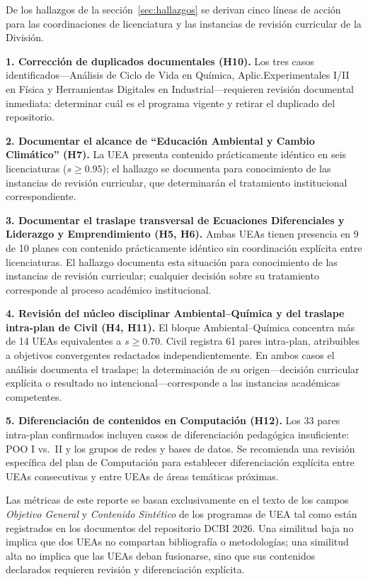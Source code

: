 \documentclass[11pt,a4paper]{article}
\begin{document}
De los hallazgos de la sección~\ref{sec:hallazgos} se derivan cinco líneas de acción para las coordinaciones de licenciatura y las instancias de revisión curricular de la División.

\textbf{1. Corrección de duplicados documentales (H10).}
Los tres casos identificados---Análisis de Ciclo de Vida en Química, Aplic.\@ Experimentales I/II en Física y Herramientas Digitales en Industrial---requieren revisión documental inmediata: determinar cuál es el programa vigente y retirar el duplicado del repositorio.

\textbf{2. Documentar el alcance de ``Educación Ambiental y Cambio Climático'' (H7).}
La UEA presenta contenido prácticamente idéntico en seis licenciaturas ($s \geq 0.95$); el hallazgo se documenta para conocimiento de las instancias de revisión curricular, que determinarán el tratamiento institucional correspondiente.

\textbf{3. Documentar el traslape transversal de Ecuaciones Diferenciales y Liderazgo y Emprendimiento (H5, H6).}
Ambas UEAs tienen presencia en 9 de 10 planes con contenido prácticamente idéntico sin coordinación explícita entre licenciaturas.
El hallazgo documenta esta situación para conocimiento de las instancias de revisión curricular; cualquier decisión sobre su tratamiento corresponde al proceso académico institucional.

\textbf{4. Revisión del núcleo disciplinar Ambiental--Química y del traslape intra-plan de Civil (H4, H11).}
El bloque Ambiental--Química concentra más de 14 UEAs equivalentes a $s \geq 0.70$.
Civil registra 61 pares intra-plan, atribuibles a objetivos convergentes redactados independientemente.
En ambos casos el análisis documenta el traslape; la determinación de su origen---decisión curricular explícita o resultado no intencional---corresponde a las instancias académicas competentes.

\textbf{5. Diferenciación de contenidos en Computación (H12).}
Los 33 pares intra-plan confirmados incluyen casos de diferenciación pedagógica insuficiente: POO I vs.\  II y los grupos de redes y bases de datos.
Se recomienda una revisión específica del plan de Computación para establecer diferenciación explícita entre UEAs consecutivas y entre UEAs de áreas temáticas próximas.

\begin{notabox}
Las métricas de este reporte se basan exclusivamente en el texto de los campos
\textit{Objetivo General} y \textit{Contenido Sintético} de los programas de UEA tal
como están registrados en los documentos del repositorio DCBI 2026.
Una similitud baja no implica que dos UEAs no compartan bibliografía o metodologías;
una similitud alta no implica que las UEAs deban fusionarse, sino que sus contenidos
declarados requieren revisión y diferenciación explícita.
\end{notabox}



\end{document}
